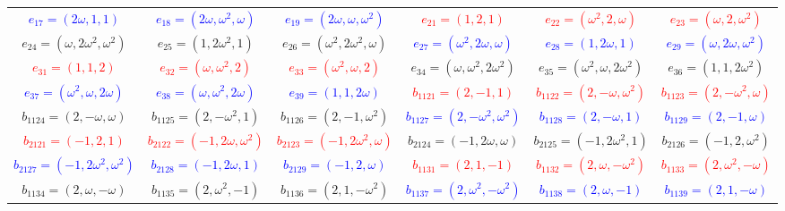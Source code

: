 \documentclass[%
  reprint,
  superscriptaddress,
  showkeys,
  amsmath,amssymb,
  aps,pra,
  longbibliography,
  floatfix,
  x11names
]{revtex4-2}
\begin{document}
\begin{table}[htbp!]
\begin{ruledtabular}
\begin{tabular}{*{6}{c}}
\textcolor{blue}{$e_{17}=(2\omega,1,1)$} & \textcolor{blue}{$e_{18}=(2\omega,\omega^2,\omega)$} & \textcolor{blue}{$e_{19}=(2\omega,\omega,\omega^2)$} & \textcolor{red}{$e_{21}=(1,2,1)$} & \textcolor{red}{$e_{22}=(\omega^2,2,\omega)$} & \textcolor{red}{$e_{23}=(\omega,2,\omega^2)$} \\
\textcolor{green!40!black}{$e_{24}=(\omega,2\omega^2,\omega^2)$} & \textcolor{green!40!black}{$e_{25}=(1,2\omega^2,1)$} & \textcolor{green!40!black}{$e_{26}=(\omega^2,2\omega^2,\omega)$} & \textcolor{blue}{$e_{27}=(\omega^2,2\omega,\omega)$} & \textcolor{blue}{$e_{28}=(1,2\omega,1)$} & \textcolor{blue}{$e_{29}=(\omega,2\omega,\omega^2)$} \\
\textcolor{red}{$e_{31}=(1,1,2)$} & \textcolor{red}{$e_{32}=(\omega,\omega^2,2)$} & \textcolor{red}{$e_{33}=(\omega^2,\omega,2)$} & \textcolor{green!40!black}{$e_{34}=(\omega,\omega^2,2\omega^2)$} & \textcolor{green!40!black}{$e_{35}=(\omega^2,\omega,2\omega^2)$} & \textcolor{green!40!black}{$e_{36}=(1,1,2\omega^2)$} \\
\textcolor{blue}{$e_{37}=(\omega^2,\omega,2\omega)$} & \textcolor{blue}{$e_{38}=(\omega,\omega^2,2\omega)$} & \textcolor{blue}{$e_{39}=(1,1,2\omega)$} & \textcolor{red}{$b_{1121}=(2,-1,1)$} & \textcolor{red}{$b_{1122}=(2,-\omega,\omega^2)$} & \textcolor{red}{$b_{1123}=(2,-\omega^2,\omega)$} \\
\textcolor{green!40!black}{$b_{1124}=(2,-\omega,\omega)$} & \textcolor{green!40!black}{$b_{1125}=(2,-\omega^2,1)$} & \textcolor{green!40!black}{$b_{1126}=(2,-1,\omega^2)$} & \textcolor{blue}{$b_{1127}=(2,-\omega^2,\omega^2)$} & \textcolor{blue}{$b_{1128}=(2,-\omega,1)$} & \textcolor{blue}{$b_{1129}=(2,-1,\omega)$} \\
\textcolor{red}{$b_{2121}=(-1,2,1)$} & \textcolor{red}{$b_{2122}=(-1,2\omega,\omega^2)$} & \textcolor{red}{$b_{2123}=(-1,2\omega^2,\omega)$} & \textcolor{green!40!black}{$b_{2124}=(-1,2\omega,\omega)$} & \textcolor{green!40!black}{$b_{2125}=(-1,2\omega^2,1)$} & \textcolor{green!40!black}{$b_{2126}=(-1,2,\omega^2)$} \\
\textcolor{blue}{$b_{2127}=(-1,2\omega^2,\omega^2)$} & \textcolor{blue}{$b_{2128}=(-1,2\omega,1)$} & \textcolor{blue}{$b_{2129}=(-1,2,\omega)$} & \textcolor{red}{$b_{1131}=(2,1,-1)$} & \textcolor{red}{$b_{1132}=(2,\omega,-\omega^2)$} & \textcolor{red}{$b_{1133}=(2,\omega^2,-\omega)$} \\
\textcolor{green!40!black}{$b_{1134}=(2,\omega,-\omega)$} & \textcolor{green!40!black}{$b_{1135}=(2,\omega^2,-1)$} & \textcolor{green!40!black}{$b_{1136}=(2,1,-\omega^2)$} & \textcolor{blue}{$b_{1137}=(2,\omega^2,-\omega^2)$} & \textcolor{blue}{$b_{1138}=(2,\omega,-1)$} & \textcolor{blue}{$b_{1139}=(2,1,-\omega)$} \\

\end{tabular}
\end{ruledtabular}
\end{table}
\end{document}
